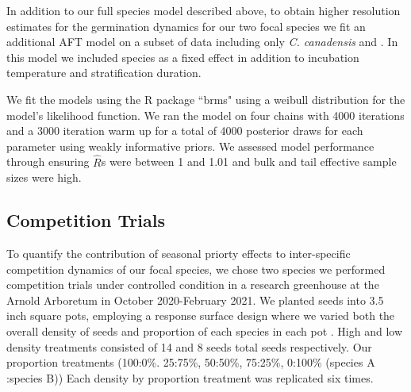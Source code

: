 \documentclass{article}\usepackage[]{graphicx}\usepackage[]{color}
\begin{document}
In addition to our full species model described above, to obtain higher resolution estimates for the germination dynamics for our two focal species we fit an additional AFT model on a subset of data including only \textit{C. canadensis} and . In this model we included species as a fixed effect in addition to incubation temperature and stratification duration. 

\noindent We fit the models using the R package ``brms" \citep{Burkner2018} using a weibull distribution for the model's likelihood function. We ran the model on four chains with 4000 iterations and a 3000 iteration warm up for a total of 4000 posterior draws for each parameter using weakly informative priors. We assessed  model performance through ensuring $\hat{R}$s were between 1 and 1.01 and bulk and tail effective sample sizes were high.

\subsection{Competition Trials}
\noindent To quantify the contribution of seasonal priorty effects to inter-specific competition dynamics of our focal species, we chose two species we performed competition trials under controlled condition in a research greenhouse at the Arnold Arboretum in October 2020-February 2021. We planted seeds into 3.5 inch square pots, employing a response surface design where we varied both the overall density of seeds and proportion of each species in each pot \citep{Inouye2001}. High and low density treatments consisted of 14 and 8 seeds total seeds respectively. Our proportion treatments (100:0\%. 25:75\%, 50:50\%, 75:25\%, 0:100\% (species A :species B)) Each density by proportion treatment was replicated six times. %
\end{document}
